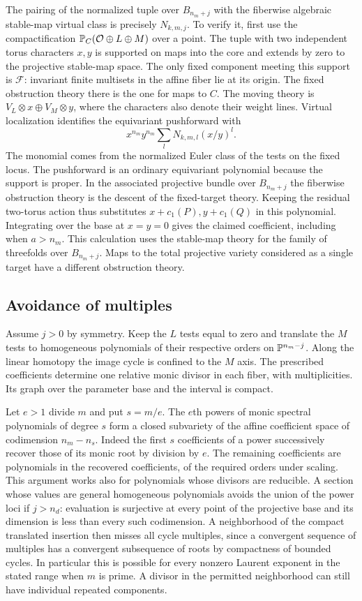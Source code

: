 The pairing of the normalized tuple over $B_{n_m+j}$ with the
fiberwise algebraic stable-map virtual class is precisely
$N_{k,m,j}$. To verify it, first use the compactification
$\mathbb P_C(\mathcal O\oplus L\oplus M)$ over a point. The tuple with
two independent torus characters $x,y$ is supported on maps into
the core and extends by zero to the projective stable-map space.
The only fixed component meeting this support is $\mathcal F$:
invariant finite multisets in the affine fiber lie at its origin.
The fixed obstruction theory there is the one for maps to $C$. The
moving theory is $V_L\otimes x\oplus V_M\otimes y$, where the
characters also denote their weight lines. Virtual localization
\cite{GP} identifies the equivariant pushforward with
\[
       x^{n_m} y^{n_m}\sum_{l}N_{k,m,l}(x/y)^l .
\]
The monomial comes from the normalized Euler class of the tests on the
fixed locus. The pushforward is an ordinary equivariant polynomial
because the support is proper. In the associated projective bundle
over $B_{n_m+j}$ the fiberwise obstruction theory is the descent of
the fixed-target theory. Keeping the residual two-torus action thus
substitutes $x+c_1(P),y+c_1(Q)$ in this polynomial. Integrating over
the base at $x=y=0$ gives the claimed coefficient, including when
$a>n_m$. This calculation uses the stable-map theory for the family
of threefolds over $B_{n_m+j}$. Maps to the total projective variety
considered as a single target have a different obstruction theory.

\subsection{Avoidance of multiples}
Assume $j>0$ by symmetry. Keep the $L$ tests equal to zero and
translate the $M$ tests to homogeneous polynomials of their respective
orders on $\mathbb P^{n_m-j}$. Along the linear homotopy the image cycle is
confined to the $M$ axis. The prescribed coefficients determine one
relative monic divisor in each fiber, with multiplicities. Its graph
over the parameter base and the interval is compact.

Let $e>1$ divide $m$ and put $s=m/e$. The $e$th powers of monic
spectral polynomials of degree $s$ form a closed subvariety of the
affine coefficient space of codimension $n_m-n_s$. Indeed the first
$s$ coefficients of a power successively recover those of its monic
root by division by $e$. The remaining coefficients are polynomials
in the recovered coefficients, of the required orders under scaling.
This argument works also for polynomials whose divisors are reducible.
A section whose values are general homogeneous polynomials avoids the
union of the power loci if $j>n_d$: evaluation is surjective at every
point of the projective base and its dimension is less than every
such codimension. A neighborhood of the compact translated insertion
then misses all cycle multiples, since a convergent sequence of
multiples has a convergent subsequence of roots by compactness of
bounded cycles. In particular this is possible for every nonzero Laurent exponent in the stated range
when $m$ is prime. A divisor in the permitted neighborhood can still
have individual repeated components.

